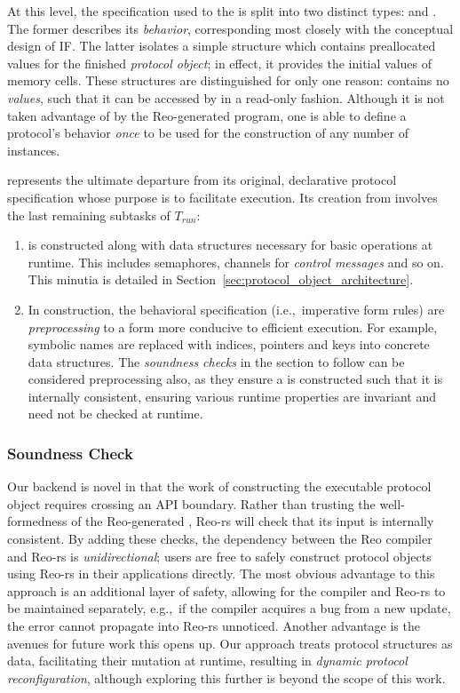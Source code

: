 At this level, the specification used to  the  is split into two distinct types:  and . The former describes its \textit{behavior}, corresponding most closely with the conceptual design of IF. The latter isolates a simple structure which contains preallocated values for the finished \textit{protocol object}; in effect, it provides the initial values of memory cells. These structures are distinguished for only one reason:  contains no \textit{values}, such that it can be accessed by  in a read-only fashion. Although it is not taken advantage of by the Reo-generated program, one is able to define a protocol's behavior \textit{once} to be used for the construction of any number of  instances.

 represents the ultimate departure from its original, declarative protocol specification whose purpose is to facilitate execution. Its creation from  involves the last remaining subtasks of $T_{run}$:
\begin{enumerate}
	\item {} is constructed along with data structures necessary for basic operations at runtime. This includes semaphores, channels for \textit{control messages} and so on. This minutia is detailed in Section~\ref{sec:protocol_object_architecture}.
	
	\item In construction, the behavioral specification (i.e.,\ imperative form rules) are \textit{preprocessing}  to a form more conducive to efficient execution. For example, symbolic names are replaced with indices, pointers and keys into concrete data structures. The \textit{soundness checks} in the section to follow can be considered preprocessing also, as they ensure a  is constructed such that it is internally consistent, ensuring various runtime properties are invariant and need not be checked at runtime.
\end{enumerate}


\subsubsection{Soundness Check}
Our backend is novel in that the work of constructing the executable protocol object requires crossing an API boundary. Rather than trusting the well-formedness of the Reo-generated , Reo-rs will check that its input is internally consistent. By adding these checks, the dependency between the Reo compiler and Reo-rs is \textit{unidirectional}; users are free to safely construct protocol objects using Reo-rs in their applications directly. The most obvious advantage to this approach is an additional layer of safety, allowing for the compiler and Reo-rs to be maintained separately, e.g.,\ if the compiler acquires a bug from a new update, the error cannot propagate into Reo-rs unnoticed. Another advantage is the avenues for future work this opens up. Our approach treats protocol structures as data, facilitating their mutation at runtime, resulting in \textit{dynamic protocol reconfiguration}, although exploring this further is beyond the scope of this work.

